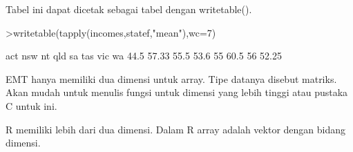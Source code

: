 \documentclass{article}
\begin{document}
\begin{eulernotebook}
\begin{eulercomment}
\begin{eulercomment}
\begin{eulercomment}
Tabel ini dapat dicetak sebagai tabel dengan writetable().
\end{eulercomment}
\begin{eulerprompt}
>writetable(tapply(incomes,statef,"mean"),wc=7)
\end{eulerprompt}
\begin{euleroutput}
      act    nsw     nt    qld     sa    tas    vic     wa
     44.5  57.33   55.5   53.6     55   60.5     56  52.25
\end{euleroutput}
\begin{eulercomment}
EMT hanya memiliki dua dimensi untuk array. Tipe datanya disebut
matriks. Akan mudah untuk menulis fungsi untuk dimensi yang lebih
tinggi atau pustaka C untuk ini.

R memiliki lebih dari dua dimensi. Dalam R array adalah vektor dengan
bidang dimensi.


\end{eulercomment}
\end{eulercomment}
\end{eulercomment}
\end{eulernotebook}
\end{document}
